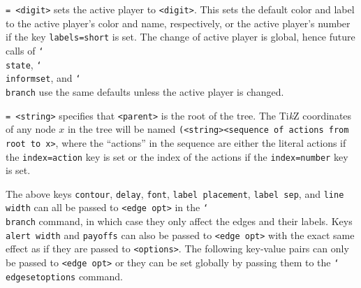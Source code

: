 \documentclass{article}
\newenvironment{desc}{\itemize[leftmargin=50pt]}{\enditemize}
\def\option#1#2{\item[\texttt{#1}] \hskip-1.5pt\texttt{#2}}
\renewcommand{\textbackslash}{\char`\\}
\def\cmd#1{\texttt{\color{cmd}\textbackslash#1}}
\def\TikZ{Ti\emph{k}Z\xspace}
\begin{document}
\begin{desc}
\option{player}{= <digit>} sets the active player to \texttt{<digit>}. This sets the default color and label to the active player's color and name, respectively, or the active player's number if the key \texttt{labels=short} is set. The change of active player is global, hence future calls of \cmd{state}, \cmd{informset}, and \cmd{branch} use the same defaults unless the active player is changed.
%

\option{root}{= <string>} specifies that \texttt{<parent>} is the root of the tree. The \TikZ coordinates of any node $x$ in the tree will be named \texttt{(<string><sequence of actions from root to x>}, where the ``actions'' in the sequence are either the literal actions if the \texttt{index=action} key is set or the index of the actions if the \texttt{index=number} key is set.
\end{desc}

\noindent The above keys \texttt{contour}, \texttt{delay}, \texttt{font}, \texttt{label placement}, \texttt{label sep}, and \texttt{line width} can all be passed to \texttt{<edge opt>} in the \cmd{branch} command, in which case they only affect the edges and their labels. Keys \texttt{alert width} and \texttt{payoffs} can also be passed to \texttt{<edge opt>} with the exact same effect as if they are passed to \texttt{<options>}. The following key-value pairs can only be passed to \texttt{<edge opt>} or they can be set globally by passing them to the \cmd{edgesetoptions} command.
\end{document}
